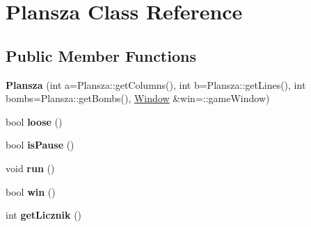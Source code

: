 \hypertarget{class_plansza}{}\section{Plansza Class Reference}
\label{class_plansza}
\subsection*{Public Member Functions}
\begin{DoxyCompactItemize}
\item 
\hypertarget{class_plansza_a526fcce132482d87bd11cfbd3252671b}{}{\bfseries Plansza} (int a=Plansza\+::get\+Columns(), int b=Plansza\+::get\+Lines(), int bombs=Plansza\+::get\+Bombs(), \hyperlink{class_window}{Window} \&win=\+::game\+Window)\label{class_plansza_a526fcce132482d87bd11cfbd3252671b}

\item 
\hypertarget{class_plansza_a0a4463b916c9c4a571b31d5a093228dc}{}bool {\bfseries loose} ()\label{class_plansza_a0a4463b916c9c4a571b31d5a093228dc}

\item 
\hypertarget{class_plansza_a511ac13ebb4efb199052dd02927b932c}{}bool {\bfseries is\+Pause} ()\label{class_plansza_a511ac13ebb4efb199052dd02927b932c}

\item 
\hypertarget{class_plansza_a916fd5990699501f56bc6a12f371e12a}{}void {\bfseries run} ()\label{class_plansza_a916fd5990699501f56bc6a12f371e12a}

\item 
\hypertarget{class_plansza_adc831ae2745a0649cc026c4d9296b2c7}{}bool {\bfseries win} ()\label{class_plansza_adc831ae2745a0649cc026c4d9296b2c7}

\item 
\hypertarget{class_plansza_a37134c284405520d57a7bc062cdfce1c}{}int {\bfseries get\+Licznik} ()\label{class_plansza_a37134c284405520d57a7bc062cdfce1c}

\end{DoxyCompactItemize}
